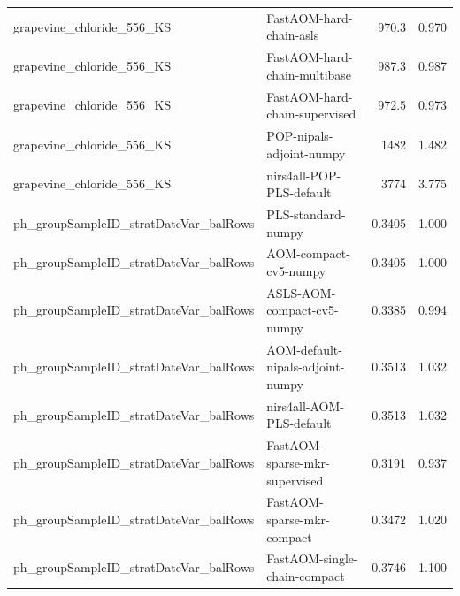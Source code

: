 \begin{landscape}
\begin{longtable}{L{8.0cm}L{9.5cm}rr}
grapevine\_\allowbreak{}chloride\_\allowbreak{}556\_\allowbreak{}KS & FastAOM-\allowbreak{}hard-\allowbreak{}chain-\allowbreak{}asls & 970.3 & 0.970 \\
grapevine\_\allowbreak{}chloride\_\allowbreak{}556\_\allowbreak{}KS & FastAOM-\allowbreak{}hard-\allowbreak{}chain-\allowbreak{}multibase & 987.3 & 0.987 \\
grapevine\_\allowbreak{}chloride\_\allowbreak{}556\_\allowbreak{}KS & FastAOM-\allowbreak{}hard-\allowbreak{}chain-\allowbreak{}supervised & 972.5 & 0.973 \\
grapevine\_\allowbreak{}chloride\_\allowbreak{}556\_\allowbreak{}KS & POP-\allowbreak{}nipals-\allowbreak{}adjoint-\allowbreak{}numpy & 1482 & 1.482 \\
grapevine\_\allowbreak{}chloride\_\allowbreak{}556\_\allowbreak{}KS & nirs4all-\allowbreak{}POP-\allowbreak{}PLS-\allowbreak{}default & 3774 & 3.775 \\
ph\_\allowbreak{}groupSampleID\_\allowbreak{}stratDateVar\_\allowbreak{}balRows & PLS-\allowbreak{}standard-\allowbreak{}numpy & 0.3405 & 1.000 \\
ph\_\allowbreak{}groupSampleID\_\allowbreak{}stratDateVar\_\allowbreak{}balRows & AOM-\allowbreak{}compact-\allowbreak{}cv5-\allowbreak{}numpy & 0.3405 & 1.000 \\
ph\_\allowbreak{}groupSampleID\_\allowbreak{}stratDateVar\_\allowbreak{}balRows & ASLS-\allowbreak{}AOM-\allowbreak{}compact-\allowbreak{}cv5-\allowbreak{}numpy & 0.3385 & 0.994 \\
ph\_\allowbreak{}groupSampleID\_\allowbreak{}stratDateVar\_\allowbreak{}balRows & AOM-\allowbreak{}default-\allowbreak{}nipals-\allowbreak{}adjoint-\allowbreak{}numpy & 0.3513 & 1.032 \\
ph\_\allowbreak{}groupSampleID\_\allowbreak{}stratDateVar\_\allowbreak{}balRows & nirs4all-\allowbreak{}AOM-\allowbreak{}PLS-\allowbreak{}default & 0.3513 & 1.032 \\
ph\_\allowbreak{}groupSampleID\_\allowbreak{}stratDateVar\_\allowbreak{}balRows & FastAOM-\allowbreak{}sparse-\allowbreak{}mkr-\allowbreak{}supervised & 0.3191 & 0.937 \\
ph\_\allowbreak{}groupSampleID\_\allowbreak{}stratDateVar\_\allowbreak{}balRows & FastAOM-\allowbreak{}sparse-\allowbreak{}mkr-\allowbreak{}compact & 0.3472 & 1.020 \\
ph\_\allowbreak{}groupSampleID\_\allowbreak{}stratDateVar\_\allowbreak{}balRows & FastAOM-\allowbreak{}single-\allowbreak{}chain-\allowbreak{}compact & 0.3746 & 1.100 \\

\end{longtable}
\end{landscape}
